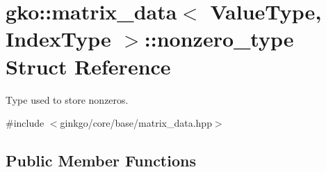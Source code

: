 \hypertarget{structgko_1_1matrix__data_1_1nonzero__type}{}\section{gko\+:\+:matrix\+\_\+data$<$ Value\+Type, Index\+Type $>$\+:\+:nonzero\+\_\+type Struct Reference}
\label{structgko_1_1matrix__data_1_1nonzero__type}


Type used to store nonzeros.  




{\ttfamily \#include $<$ginkgo/core/base/matrix\+\_\+data.\+hpp$>$}

\subsection*{Public Member Functions}
